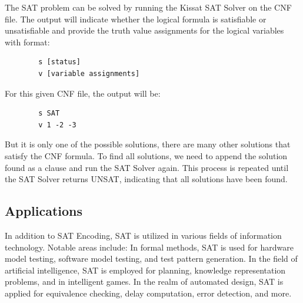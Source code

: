The SAT problem can be solved by running the Kissat SAT Solver on the CNF file.
The output will indicate whether the logical formula is satisfiable or unsatisfiable
and provide the truth value assignments for the logical variables with format:
\begin{center}
    \begin{verbatim}
        s [status]
        v [variable assignments]
    \end{verbatim}
\end{center}

For this given CNF file, the output will be:
\begin{center}
    \begin{verbatim}
        s SAT
        v 1 -2 -3
    \end{verbatim}
\end{center}

But it is only one of the possible solutions, there are many other solutions that satisfy the CNF formula.
To find all solutions, we need to append the solution found as a clause and run the SAT Solver again.
This process is repeated until the SAT Solver returns UNSAT, indicating that all solutions have been found.

\subsection{Applications}
In addition to SAT Encoding, SAT is utilized in various fields of information
technology. Notable areas include: In formal methods, SAT is used for hardware model
testing, software model testing, and test pattern generation. In the field of artificial
intelligence, SAT is employed for planning, knowledge representation problems, and in
intelligent games. In the realm of automated design, SAT is applied for equivalence
checking, delay computation, error detection, and more.